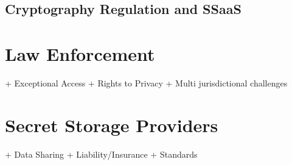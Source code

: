 \subsection{Cryptography Regulation and SSaaS}



\cite{thompson-thirdparty}


\section{Law Enforcement}
\label{chap:policy:leo}

+ Exceptional Access
+ Rights to Privacy
+ Multi jurisdictional challenges

\section{Secret Storage Providers}
\label{chap:policy:ssp}

+ Data Sharing
+ Liability/Insurance
+ Standards

